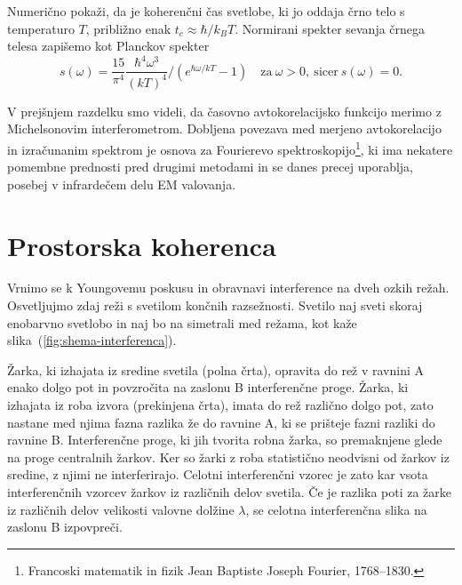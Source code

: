 \begin{definition}\label{naloga-Planck}
Numerično pokaži, da je koherenčni čas svetlobe, ki jo oddaja črno telo s 
temperaturo $T$, približno enak $t_{c}\approx{\hbar}/{k_{B}T}$.
Normirani spekter sevanja črnega telesa zapišemo 
kot Planckov spekter 
\begin{equation}
s(\omega)=\frac{15}{\pi^{4}} \frac{\hbar^4\omega^3}{(kT)^4}/\left(e^{\hbar\omega/kT}-1\right)
\quad \textrm{za}~\omega >0,~\textrm{sicer}~s(\omega) = 0.
\label{eq:Planckov-spekter}
\end{equation}
\end{definition}

\begin{remark}
V prejšnjem razdelku smo videli, da časovno avtokorelacijsko funkcijo
merimo z Michelsonovim interferometrom. Dobljena povezava med merjeno
avtokorelacijo in izračunanim spektrom je osnova za Fourierevo 
spektroskopijo\footnote{Francoski matematik in fizik Jean Baptiste Joseph Fourier, 1768--1830.},
ki ima nekatere pomembne prednosti pred drugimi metodami in se danes
precej uporablja, posebej v infrardečem delu EM valovanja.
\end{remark}

\section{Prostorska koherenca}
\label{Prostorska-koherenca}
Vrnimo se k Youngovemu poskusu in obravnavi interference
 na dveh ozkih režah. 
Osvetljujmo zdaj reži s svetilom končnih razsežnosti. Svetilo naj sveti skoraj enobarvno
svetlobo in naj bo na simetrali med režama, kot kaže slika~(\ref{fig:shema-interferenca}).

Žarka, ki izhajata iz sredine svetila (polna črta), 
opravita do rež v ravnini A enako dolgo pot in povzročita na zaslonu B 
interferenčne proge. Žarka, ki izhajata iz roba izvora (prekinjena črta), 
imata do rež različno dolgo pot, zato nastane med njima fazna razlika že do ravnine A, 
ki se prišteje fazni razliki do ravnine B. Interferenčne proge, ki jih tvorita 
robna žarka, so premaknjene glede na proge centralnih žarkov. Ker so žarki z roba
statistično neodvisni od žarkov iz sredine, z njimi
ne interferirajo. Celotni interferenčni vzorec je zato kar vsota interferenčnih
vzorcev žarkov iz različnih delov svetila. Če je razlika poti za žarke
iz različnih delov velikosti valovne dolžine $\lambda$, se celotna
interferenčna slika na zaslonu B izpovpreči.

